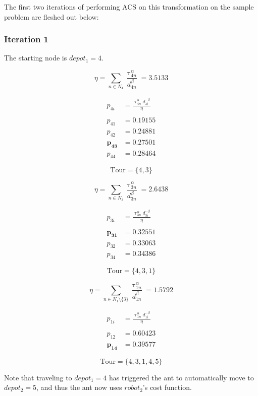 \documentclass[a4paper]{article}
\begin{document}
The first two iterations of performing ACS on this transformation on the sample problem are fleshed out below:

\subsubsection{Iteration 1}

The starting node is $depot_1 = 4$.

$$
\eta = \sum_{n \in N_4} \frac{\uptau_{4n}^\alpha}{d_{4n}^\beta} = 3.5133
$$

\begin{align*}
p_{4i} &= \frac{\uptau_{4n}^\alpha d_{4i}^{-\beta}}{\eta} \\
\\
p_{41} &= 0.19155 \\
p_{42} &= 0.24881 \\
\mathbf{p_{43}} &= \mathbf{0.27501} \\
p_{44} &= 0.28464
\end{align*}

$$
\text{Tour} = \{4, 3\}
$$


$$
\eta = \sum_{n \in N_3} \frac{\uptau_{3n}^\alpha}{d_{3n}^\beta} = 2.6438
$$

\begin{align*}
p_{3i} &= \frac{\uptau_{3n}^\alpha d_{3i}^{-\beta}}{\eta} \\
\\
\mathbf{p_{31}} &= \mathbf{0.32551} \\
p_{32} &= 0.33063 \\
p_{34} &= 0.34386
\end{align*}

$$
\text{Tour} = \{4, 3, 1\}
$$


$$
\eta = \sum_{n \in N_1\setminus\{3\}} \frac{\uptau_{1n}^\alpha}{d_{1n}^\beta} = 1.5792
$$

\begin{align*}
p_{1i} &= \frac{\uptau_{1n}^\alpha d_{1i}^{-\beta}}{\eta} \\
\\
p_{12} &= 0.60423 \\
\mathbf{p_{14}} &= \mathbf{0.39577}
\end{align*}

$$
\text{Tour} = \{4, 3, 1, 4, 5\}
$$

Note that traveling to $depot_1 = 4$ has triggered the ant to automatically move to $depot_2 = 5$, and thus the ant now uses $robot_2$'s cost function.
\end{document}
